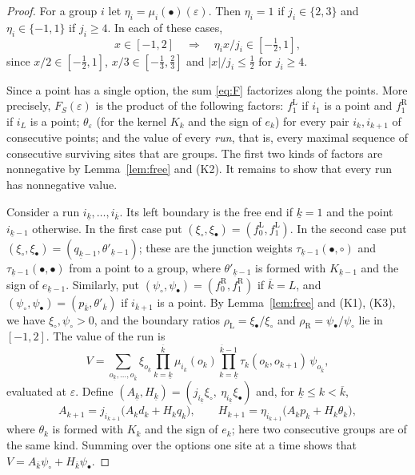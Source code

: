 \documentclass{amsart}
\theoremstyle{definition}
\theoremstyle{remark}
\numberwithin{equation}{section}
\newcommand{\vac}{\circ}
\newcommand{\occ}{\bullet}
\begin{document}
\begin{proof}
For a group $i$ let $\eta_i=\mu_i(\occ)(\varepsilon)$. Then $\eta_i=1$ if $j_i\in\{2,3\}$ and $\eta_i\in\{-1,1\}$ if $j_i\ge4$. In each of these cases,
\begin{equation}\label{eq:interval}
x\in[-1,2]\quad\Longrightarrow\quad \eta_ix/j_i\in[-\tfrac12,1],
\end{equation}
since $x/2\in[-\frac12,1]$, $x/3\in[-\frac13,\frac23]$ and $|x|/j_i\le\frac12$ for $j_i\ge4$.

Since a point has a single option, the sum \eqref{eq:F} factorizes along the points. More precisely, $F_S(\varepsilon)$ is the product of the following factors: $f^{\mathrm L}_1$ if $i_1$ is a point and $f^{\mathrm R}_1$ if $i_L$ is a point; $\theta_{\varepsilon}$ (for the kernel $K_k$ and the sign of $e_k$) for every pair $i_k,i_{k+1}$ of consecutive points; and the value of every \emph{run}, that is, every maximal sequence of consecutive surviving sites that are groups. The first two kinds of factors are nonnegative by Lemma~\ref{lem:free} and (K2). It remains to show that every run has nonnegative value.

Consider a run $i_{\underline k},\dots,i_{\overline k}$. Its left boundary is the free end if $\underline k=1$ and the point $i_{\underline k-1}$ otherwise. In the first case put $(\xi_\vac,\xi_\occ)=(f^{\mathrm L}_0,f^{\mathrm L}_1)$. In the second case put $(\xi_\vac,\xi_\occ)=(q_{\underline k-1},\theta'_{\underline k-1})$; these are the junction weights $\tau_{\underline k-1}(\occ,\vac)$ and $\tau_{\underline k-1}(\occ,\occ)$ from a point to a group, where $\theta'_{\underline k-1}$ is formed with $K_{\underline k-1}$ and the sign of $e_{\underline k-1}$. Similarly, put $(\psi_\vac,\psi_\occ)=(f^{\mathrm R}_0,f^{\mathrm R}_1)$ if $\overline k=L$, and $(\psi_\vac,\psi_\occ)=(p_{\overline k},\theta'_{\overline k})$ if $i_{\overline k+1}$ is a point. By Lemma~\ref{lem:free} and (K1), (K3), we have $\xi_\vac,\psi_\vac>0$, and the boundary ratios $\rho_{\mathrm L}=\xi_\occ/\xi_\vac$ and $\rho_{\mathrm R}=\psi_\occ/\psi_\vac$ lie in $[-1,2]$. The value of the run is
\[
V=\sum_{o_{\underline k},\dots,o_{\overline k}}\xi_{o_{\underline k}}\prod_{k=\underline k}^{\overline k}\mu_{i_k}(o_k)\prod_{k=\underline k}^{\overline k-1}\tau_k(o_k,o_{k+1})\,\psi_{o_{\overline k}},
\]
evaluated at $\varepsilon$. Define $(A_{\underline k},H_{\underline k})=(j_{i_{\underline k}}\xi_\vac,\ \eta_{i_{\underline k}}\xi_\occ)$ and, for $\underline k\le k<\overline k$,
\[
A_{k+1}=j_{i_{k+1}}\bigl(A_kd_k+H_kq_k\bigr),\qquad H_{k+1}=\eta_{i_{k+1}}\bigl(A_kp_k+H_k\theta_k\bigr),
\]
where $\theta_k$ is formed with $K_k$ and the sign of $e_k$; here two consecutive groups are of the same kind. Summing over the options one site at a time shows that $V=A_{\overline k}\psi_\vac+H_{\overline k}\psi_\occ$.


\end{proof}
\end{document}
